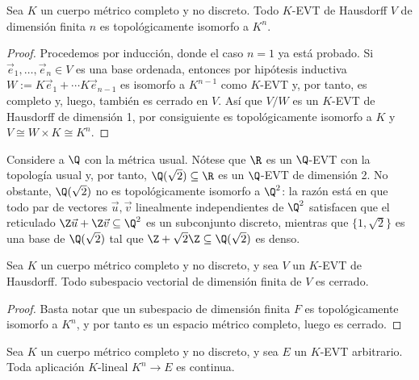 \documentclass[topologia-analisis.tex]{subfiles}
\begin{document}
\begin{thm}
	Sea $K$ un cuerpo métrico completo y no discreto.
	Todo $K$-EVT de Hausdorff $V$ de dimensión finita $n$ es topológicamente isomorfo a $K^n$.
\end{thm}
\begin{proof}
	Procedemos por inducción, donde el caso $n = 1$ ya está probado.
	Si $\vec e_1, \dots, \vec e_n \in V$ es una base ordenada, entonces por hipótesis inductiva $W := K\vec e_1 + \cdots K\vec e_{n-1}$ es isomorfo
	a $K^{n-1}$ como $K$-EVT y, por tanto, es completo y, luego, también es cerrado en $V$.
	Así que $V/W$ es un $K$-EVT de Hausdorff de dimensión 1, por consiguiente es topológicamente isomorfo a $K$ y $V \cong W \times K \cong K^n$.
\end{proof}
\begin{ex}
	Considere a $\Q$ con la métrica usual.
	Nótese que $\R$ es un $\Q$-EVT con la topología usual y, por tanto, $\Q(\sqrt{2}) \subseteq \R$ es un $\Q$-EVT de dimensión 2.
	No obstante, $\Q(\sqrt{2})$ no es topológicamente isomorfo a $\Q^2$: la razón está en que todo par de vectores $\vec u, \vec v$
	linealmente independientes de $\Q^2$ satisfacen que el reticulado $\Z\vec u + \Z\vec v \subseteq \Q^2$ es un subconjunto discreto,
	mientras que $\{ 1, \sqrt{2} \}$ es una base de $\Q(\sqrt{2})$ tal que $\Z + \sqrt{2}\Z \subseteq \Q(\sqrt{2})$ es denso.
\end{ex}

\begin{cor}
	Sea $K$ un cuerpo métrico completo y no discreto, y sea $V$ un $K$-EVT de Hausdorff.
	Todo subespacio vectorial de dimensión finita de $V$ es cerrado.
\end{cor}
\begin{proof}
	Basta notar que un subespacio de dimensión finita $F$ es topológicamente isomorfo a $K^n$, y por tanto es un espacio métrico completo,
	luego es cerrado.
\end{proof}
\begin{cor}
	Sea $K$ un cuerpo métrico completo y no discreto, y sea $E$ un $K$-EVT arbitrario.
	Toda aplicación $K$-lineal $K^n \to E$ es continua.
\end{cor}
\end{document}

